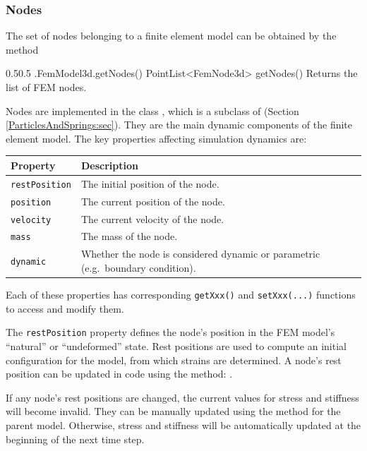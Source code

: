 \subsubsection{Nodes}
\ifLaTeXML{\newline}

The set of nodes belonging to a finite element model can be obtained by the method
%
\begin{methodtable}{0.5}{0.5}
\midline
%
\methodentry
{\fem.FemModel3d.getNodes()}%
{PointList<FemNode3d> getNodes()}%
{Returns the list of FEM nodes.}%
%
\midline
\end{methodtable}
%
Nodes are implemented in the class 
, which is a subclass of 
 (Section 
\ref{ParticlesAndSprings:sec}).  They are the main dynamic components of
the finite element model.  The key properties affecting simulation dynamics
are:
\begin{center}
\begin{tabular}{|ll|}
  \hline
  Property & Description\\
  \hline
  {\tt restPosition} & The initial position of the node.\\
  {\tt position} & The current position of the node.\\
  {\tt velocity} & The current velocity of the node.\\
  {\tt mass} & The mass of the node.\\
  {\tt dynamic} & Whether the node is considered dynamic or parametric 
                  (e.g.~boundary condition).\\
  \hline
\end{tabular}
\end{center}
Each of these properties has corresponding {\tt getXxx()} and 
{\tt setXxx(...)} functions to access and modify them.

The {\tt restPosition} property defines the node's position in the FEM model's 
``natural'' or ``undeformed'' state.  Rest positions are used to compute
an initial configuration for the model, from which strains are determined.  A
node's rest position can be updated in code using the method:
.

\begin{sideblock}
If any node's rest positions are changed, the current values 
for stress and stiffness will become invalid.  They can be manually
updated using the method  for the parent model. Otherwise,
stress and stiffness will be automatically updated at the beginning of the 
next time step. 
\end{sideblock}

